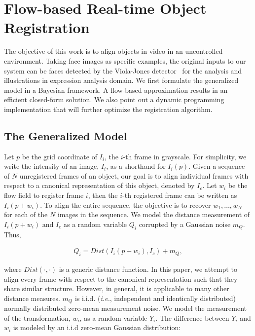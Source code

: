 \documentclass[10pt,journal]{IEEEtran}
\begin{document}
\section{\label{sec:approach}Flow-based Real-time Object Registration}

The objective of this work is to align objects in video in an uncontrolled environment. Taking face images as specific examples, the original inputs to our system can be faces detected by the Viola-Jones detector~\cite{Viola_IJCV04} for the analysis and illustrations in expression analysis domain. We first formulate the generalized model in a Bayesian framework. A flow-based approximation results in an efficient closed-form solution. We also point out a dynamic programming implementation that will further optimize the registration algorithm.

\subsection{\label{sec:model}The Generalized Model}

Let $p$ be the grid coordinate of $I_i$, the $i$-th frame in grayscale. For simplicity, we write the intensity of an image, $I_i$, as a shorthand for $I_i(p)$. Given a sequence of $N$ unregistered frames of an object, our goal is to align individual frames with respect to a canonical representation of this object, denoted by $I_c$. Let $w_i$ be the flow field to register frame $i$, then the $i$-th registered frame can be written as $I_i(p+w_i)$. To align the entire sequence, the objective is to recover $w_1,\ldots,w_N$ for each of the $N$ images in the sequence.  We model the distance measurement of $I_i(p+w_i)$ and $I_c$ as a random variable $Q_i$ corrupted by a Gaussian noise $m_Q$. Thus,

\begin{align}
\label{model:measurement}
Q_i=Dist(I_i(p+w_i),I_c)+m_Q,
\end{align}

\noindent where $Dist(\cdot,\cdot)$ is a generic distance function. In this paper, we attempt to align every frame with respect to the canonical representation such that they share similar structure. However, in general, it is applicable to many other distance measures. $m_Q$ is i.i.d. (\textit{i.e.}, independent and identically distributed) normally distributed zero-mean measurement noise. We model the measurement of the transformation, $w_i$, as a random variable $Y_i$. The difference between $Y_i$ and $w_i$ is modeled by an i.i.d zero-mean Gaussian distribution:
\end{document}
